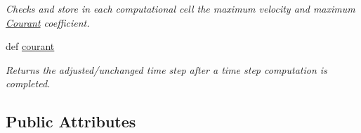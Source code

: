 \begin{DoxyCompactItemize}
\begin{DoxyCompactList}\small\item\em Checks and store in each computational cell the maximum velocity and maximum \hyperlink{classmain__src_1_1courant_1_1Courant}{Courant} coefficient. \end{DoxyCompactList}\item 
def \hyperlink{classmain__src_1_1courant_1_1Courant_a85d5d8bddfb7c2bf55e387a18dbb2864}{courant}
\begin{DoxyCompactList}\small\item\em Returns the adjusted/unchanged time step after a time step computation is completed. \end{DoxyCompactList}\end{DoxyCompactItemize}
\subsection*{Public Attributes}
